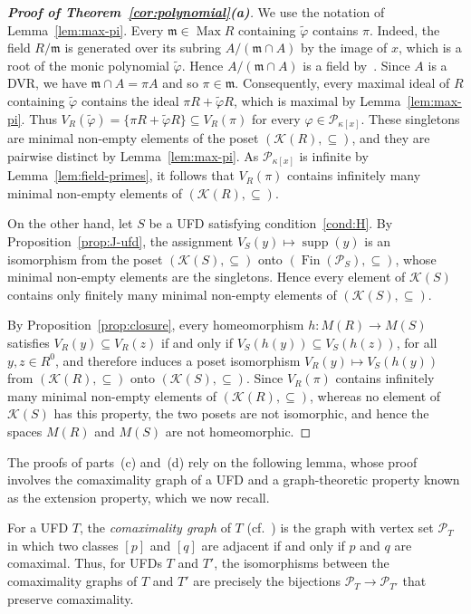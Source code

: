 \documentclass[12pt,reqno,a4paper]{amsart}
\newcommand{\Pe}{\mathcal{P}}
\newcommand{\K}{\mathcal{K}}
\newcommand{\m}{\mathfrak{m}}
\DeclareMathOperator{\Max}{Max}
\DeclareMathOperator{\Fin}{Fin}
\DeclareMathOperator{\supp}{supp}
\theoremstyle{plain}
\theoremstyle{definition}
\begin{document}
\begin{proof}[\normalfont\bfseries Proof of Theorem~\ref{cor:polynomial}(a)]
We use the notation of Lemma~\ref{lem:max-pi}. Every $\m\in\Max R$ containing $\tilde\varphi$ contains $\pi$. Indeed, the field $R/\m$ is generated over its subring $A/(\m\cap A)$ by the image of $x$, which is a root of the monic polynomial $\tilde\varphi$. Hence $A/(\m\cap A)$ is a field by~\cite[Proposition~5.7]{AtiyahMacdonald}. Since $A$ is a DVR, we have $\m\cap A=\pi A$ and so $\pi\in\m$. Consequently, every maximal ideal of $R$ containing $\tilde\varphi$ contains the ideal $\pi R+\tilde\varphi R$, which is maximal by Lemma~\ref{lem:max-pi}. Thus $V_R(\tilde\varphi)=\{\pi R+\tilde\varphi R\}\subseteq V_R(\pi)$ for every $\varphi\in\Pe_{\kappa[x]}$. These singletons are minimal non-empty elements of the poset $(\K(R),\subseteq)$, and they are pairwise distinct by Lemma~\ref{lem:max-pi}. As $\Pe_{\kappa[x]}$ is infinite by Lemma~\ref{lem:field-primes}, it follows that $V_R(\pi)$ contains infinitely many minimal non-empty elements of $(\K(R),\subseteq)$.

On the other hand, let $S$ be a UFD satisfying condition~\ref{cond:H}. By Proposition~\ref{prop:J-ufd}, the assignment $V_S(y)\mapsto\supp(y)$ is an isomorphism from the poset $(\K(S),\subseteq)$ onto $(\Fin(\Pe_S),\subseteq)$, whose minimal non-empty elements are the singletons. Hence every element of $\K(S)$ contains only finitely many minimal non-empty elements of $(\K(S),\subseteq)$.

By Proposition~\ref{prop:closure}, every homeomorphism $h\colon M(R)\to M(S)$ satisfies $V_R(y)\subseteq V_R(z)$ if and only if $V_S(h(y))\subseteq V_S(h(z))$, for all $y,z\in R^0$, and therefore induces a poset isomorphism $V_R(y)\mapsto V_S(h(y))$ from $(\K(R),\subseteq)$ onto $(\K(S),\subseteq)$. Since $V_R(\pi)$ contains infinitely many minimal non-empty elements of $(\K(R),\subseteq)$, whereas no element of $\K(S)$ has this property, the two posets are not isomorphic, and hence the spaces $M(R)$ and $M(S)$ are not homeomorphic.
\end{proof}

The proofs of parts~(c) and~(d) rely on the following lemma, whose proof involves the comaximality graph of a UFD and a graph-theoretic property known as the extension property, which we now recall.

For a UFD $T$, the \emph{comaximality graph} of $T$ (cf.~\cite{SharmaBhatwadekar,MaimaniEtAl}) is the graph with vertex set $\Pe_T$ in which two classes $[p]$ and $[q]$ are adjacent if and only if $p$ and $q$ are comaximal. Thus, for UFDs $T$ and $T'$, the isomorphisms between the comaximality graphs of $T$ and $T'$ are precisely the bijections $\Pe_T\to\Pe_{T'}$ that preserve comaximality. 
\end{document}
